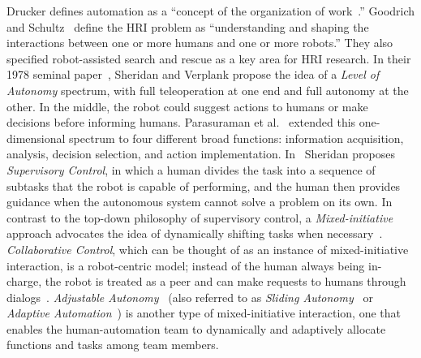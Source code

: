 \documentclass[journal]{IEEEtran}
\begin{document}
Drucker defines automation as a ``concept of the organization of work~\cite{Drucker2006Practice}.'' Goodrich and Schultz~\cite{Goodrich2007HRISurvey} define the HRI problem as ``understanding and shaping the interactions between one or more humans and one or more robots.'' They also specified robot-assisted search and rescue as a key area for HRI research. In their 1978 seminal paper~\cite{Sheridan1978Human}, Sheridan and Verplank propose the idea of a \textit{Level of Autonomy} spectrum, with full teleoperation at one end and full autonomy at the other. In the middle, the robot could suggest actions to humans or make decisions before informing humans. Parasuraman et al.\ \cite{Parasuraman2000Model} extended this one-dimensional spectrum to four different broad functions: information acquisition, analysis, decision selection, and action implementation. In~\cite{Sheridan1992Telerobotics} Sheridan proposes \textit{Supervisory Control}, in which a human divides the task into a sequence of subtasks that the robot is capable of performing, and the human then provides guidance when the autonomous system cannot solve a problem on its own. In contrast to the top-down philosophy of supervisory control, a \textit{Mixed-initiative} approach advocates the idea of dynamically shifting tasks when necessary~\cite{Hearst1999Mixed}. \textit{Collaborative Control}, which can be thought of as an instance of mixed-initiative interaction, is a robot-centric model; instead of the human always being in-charge, the robot is treated as a peer and can make requests to humans through dialogs~\cite{Fong1999Collaborative}. \textit{Adjustable Autonomy}~\cite{Dorais2001Designing} (also referred to as \textit{Sliding Autonomy}~\cite{Dias2008SlidingAutonomy} or \textit{Adaptive Automation}~\cite{Rouse1988Adaptive}) is another type of mixed-initiative interaction, one that enables the human-automation team to dynamically and adaptively allocate functions and tasks among team members. 
\end{document}
